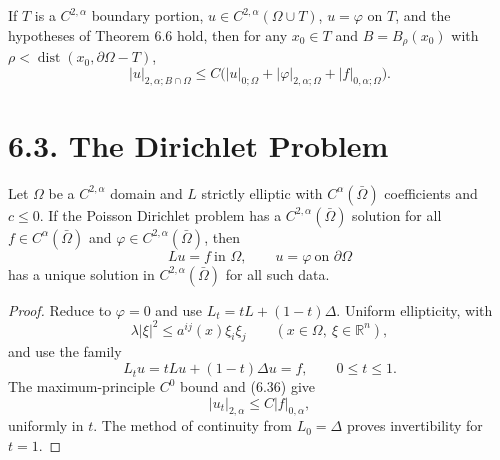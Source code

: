 \begin{corollary}
\label{gt-ch06-cor-6-7}
If $T$ is a $C^{2,\alpha}$ boundary portion, $u\in C^{2,\alpha}(\Omega\cup T)$,
$u=\varphi$ on $T$, and the hypotheses of Theorem 6.6 hold, then for any
$x_0\in T$ and $B=B_\rho(x_0)$ with $\rho<\operatorname{dist}(x_0,\partial\Omega-T)$,
\begin{equation}\tag{6.38}
|u|_{2,\alpha;B\cap\Omega}\le C\bigl(|u|_{0;\Omega}+|\varphi|_{2,\alpha;\Omega}+|f|_{0,\alpha;\Omega}\bigr).
\end{equation}
\end{corollary}

\section*{6.3. The Dirichlet Problem}

\begin{theorem}
\label{gt-ch06-thm-6-8}
Let $\Omega$ be a $C^{2,\alpha}$ domain and $L$ strictly elliptic with
$C^\alpha(\bar\Omega)$ coefficients and $c\le0$.  If the Poisson Dirichlet
problem has a $C^{2,\alpha}(\bar\Omega)$ solution for all
$f\in C^\alpha(\bar\Omega)$ and $\varphi\in C^{2,\alpha}(\bar\Omega)$, then
\begin{equation}\tag{6.39}
Lu=f\ \text{in }\Omega,\qquad u=\varphi\ \text{on }\partial\Omega
\end{equation}
has a unique solution in $C^{2,\alpha}(\bar\Omega)$ for all such data.
\end{theorem}
\begin{proof}
\sketch Reduce to $\varphi=0$ and use $L_t=tL+(1-t)\Delta$.  Uniform ellipticity,
with
\begin{equation}
\tag{6.40}
\lambda|\xi|^2\leq a^{ij}(x)\xi_i\xi_j
\qquad(x\in\Omega,\ \xi\in\mathbb R^n),
\end{equation}
and use the family
\begin{equation}
\tag{6.41}
L_tu=tLu+(1-t)\Delta u=f,\qquad0\leq t\leq1.
\end{equation}
The maximum-principle $C^0$ bound and (6.36) give
\begin{equation}
\tag{6.42}
|u_t|_{2,\alpha}\leq C|f|_{0,\alpha},
\end{equation}
uniformly in $t$. The method of continuity from
$L_0=\Delta$ proves invertibility for $t=1$.
\end{proof}

